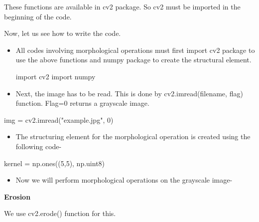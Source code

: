 \documentclass[]{article}
\newenvironment{Shaded}{}{}
\newcommand{\DecValTok}[1]{\textcolor[rgb]{0.25,0.63,0.44}{{#1}}}
\newcommand{\StringTok}[1]{\textcolor[rgb]{0.25,0.44,0.63}{{#1}}}
\newcommand{\ImportTok}[1]{{#1}}
\newcommand{\OperatorTok}[1]{\textcolor[rgb]{0.40,0.40,0.40}{{#1}}}
\newcommand{\NormalTok}[1]{{#1}}
\providecommand{\tightlist}{%
  \setlength{\itemsep}{0pt}\setlength{\parskip}{0pt}}
\begin{document}
These functions are available in cv2 package. So cv2 must be imported in
the beginning of the code.

Now, let us see how to write the code.

\begin{itemize}
\item
  All codes involving morphological operations must first import cv2
  package to use the above functions and numpy package to create the
  structural element.

\begin{Shaded}
\begin{Highlighting}[]
\ImportTok{import} \NormalTok{cv2}
\ImportTok{import} \NormalTok{numpy}
\end{Highlighting}
\end{Shaded}
\item
  Next, the image has to be read. This is done by cv2.imread(filename,
  flag) function. Flag=0 returns a grayscale image.
\end{itemize}

\begin{Shaded}
\begin{Highlighting}[]
    \NormalTok{img }\OperatorTok{=} \NormalTok{cv2.imread(}\StringTok{"example.jpg"}\NormalTok{, }\DecValTok{0}\NormalTok{)}
\end{Highlighting}
\end{Shaded}

\begin{itemize}
\tightlist
\item
  The structuring element for the morphological operation is created
  using the following code-
\end{itemize}

\begin{Shaded}
\begin{Highlighting}[]
    \NormalTok{kernel }\OperatorTok{=} \NormalTok{np.ones((}\DecValTok{5}\NormalTok{,}\DecValTok{5}\NormalTok{), np.uint8)}
\end{Highlighting}
\end{Shaded}

\begin{itemize}
\tightlist
\item
  Now we will perform morphological operations on the grayscale image-
\end{itemize}

\textbf{Erosion}

We use cv2.erode() function for this.
\end{document}

